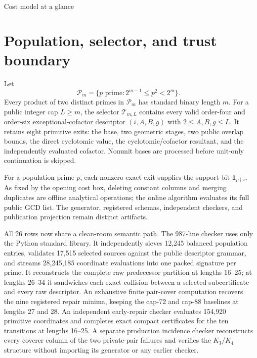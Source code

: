 \documentclass[11pt]{article}
\begin{document}
\begin{costmodel}{Cost model at a glance}
\end{costmodel}

\section{Population, selector, and trust boundary}

Let
\[
 \mathcal P_m=\{p\text{ prime}:2^{m-1}\le p^2<2^m\}.
\]
Every product of two distinct primes in \(\mathcal P_m\) has standard binary
length \(m\).  For a public integer cap \(L\ge m\), the selector
\(\mathcal T_{m,L}\) contains every valid order-four and order-six
exceptional-cofactor descriptor \((i,A,B,g)\) with
\(2\le A,B,g\le L\).  It retains eight primitive exits: the base, two
geometric stages, two public overlap bounds, the direct cyclotomic value,
the cyclotomic/cofactor resultant, and the independently evaluated cofactor.
Nonunit bases are processed before unit-only continuation is skipped.

For a population prime \(p\), each nonzero exact exit supplies the support
bit \(\mathbf1_{p\mid z}\).  As fixed by the opening cost box, deleting
constant columns and merging duplicates are offline analytical operations;
the online algorithm evaluates its full public GCD list.  The generator,
registered schemas, independent checkers, and publication projection remain
distinct artifacts.

All 26 rows now share a clean-room semantic path.  The 987-line checker uses
only the Python standard library.  It independently sieves 12,245 balanced
population entries, validates 17,515 selected sources against the public
descriptor grammar, and streams 28,245,185 coordinate evaluations into one
packed signature per prime.  It reconstructs the complete raw predecessor
partition at lengths 16--25; at lengths 26--34 it sandwiches each exact
collision between a selected subcertificate and every raw descriptor.
An exhaustive finite pair-cover computation recovers the nine registered
repair minima, keeping the cap-72 and cap-88 baselines at lengths 27 and 28.
An independent early-repair checker evaluates 154,920 primitive coordinates
and completes exact compact certificates for the ten transitions at lengths
16--25.  A separate production incidence checker reconstructs every coverer
column of the two private-pair failures and verifies the \(K_3/K_4\)
structure without importing its generator or any earlier checker.
\end{document}
